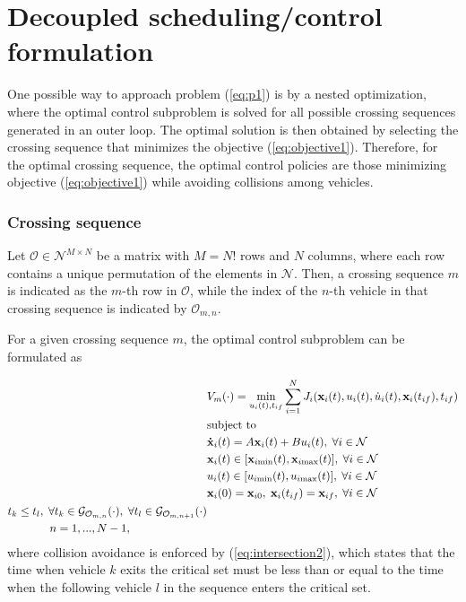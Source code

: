 \documentclass[letterpaper,10pt,conference]{ieeeconf}
\begin{document}
\section{Decoupled scheduling/control formulation} \label{sec:decoupled}

One possible way to approach problem (\ref{eq:p1}) is by a nested optimization, where the optimal control subproblem is solved for all possible crossing sequences generated in an outer loop. The optimal solution is then obtained by selecting the crossing sequence that minimizes the objective (\ref{eq:objective1}). Therefore, for the optimal crossing sequence, the optimal control policies are those  minimizing objective (\ref{eq:objective1}) while avoiding collisions among vehicles.

\subsubsection{Crossing sequence} Let $\mathcal{O}\in\mathcal{N}^{M\times N}$ be a matrix with \mbox{$M=N!$} rows and $N$ columns, where each row contains a unique permutation of the elements in $\mathcal{N}$. Then, a crossing sequence $m$ is indicated as the $m$-th row in $\mathcal{O}$, while the index of the $n$-th vehicle in that crossing sequence is indicated by $\mathcal{O}_{m,n}$.

For a given crossing sequence $m$, the optimal control subproblem can be formulated as

{\allowdisplaybreaks
\begin{subequations} \label{eq:p2}
\begin{align}
&V_{m}(\cdot)=\min_{u_i(t), t_{if}} \sum_{i=1}^N J_i(\mathbf{x}_i(t),u_i(t),\dot u_i(t), \mathbf{x}_i(t_{if}), t_{if}) \nonumber\\
&\text{subject to} \nonumber\\
&\mathbf{\dot x}_i(t)=A \mathbf{x}_i(t)+ B u_i(t), \; \forall i \in \mathcal{N} \label{eq:linsys2}\\
&\mathbf{x}_i(t) \in [\mathbf{x}_{i\text{min}}(t), \mathbf{x}_{i\text{max}}(t)], \; \forall i \in \mathcal{N} \label{eq:statecstr2}\\
&u_i(t) \in [u_{i\text{min}}(t), u_{i\text{max}}(t)], \; \forall i \in \mathcal{N} \label{eq:controlcstr2}\\
&\mathbf{x}_i(0)=\mathbf{x}_{i0}, \; \mathbf{x}_i(t_{if})=\mathbf{x}_{if}, \; \forall i \in \mathcal{N}\\
\begin{split} \label{eq:intersection2}
&t_k \leq t_l, \; \forall t_k \in \mathcal{G}_{\mathcal{O}_{m,n}}(\cdot), \; \forall t_l \in \mathcal{G}_{\mathcal{O}_{m,n+1}}(\cdot)\\
&\hspace{13mm}n=1,...,N-1,
\end{split}
\end{align}
\end{subequations}}%
where collision avoidance is enforced by (\ref{eq:intersection2}), which states that the time when vehicle $k$ exits the critical set must be less than or equal to the time when the following vehicle $l$ in the sequence enters the critical set.
\end{document}
